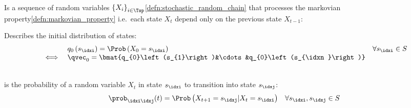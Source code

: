 \begin{defnbox}
  \begin{defn}\label{defn:markov_chain}\leavevmode\\
  \begin{minipage}[t]{0.6\textwidth}
    Is a sequence of random variables $\left\{X_{i}\right\}_{i\in\Tsp}$\cref{defn:stochastic_random_chain}
    that processes the markovian property\cref{defn:markovian_property} i.e.\ each state $X_{t}$
    depend only on the previous state $X_{t-1}$:
  \end{minipage}
  \begin{minipage}[t]{0.3\textwidth}
    \begin{figure}[H]
      \vspace{-0.7cm}
      \centering{
        \def\svgwidth{100pt}
        \resizebox{\linewidth}{!}{}
      }
    \end{figure}
  \end{minipage}
  \end{defn}
\end{defnbox}
\begin{defnbox}\nospacing
  \begin{defn}\label{defn:initial_distribution}
    Describes the initial distribution of states:
    \begin{align}
      &&&q_{0}\left(s_{\idxi}\right)=\Prob \left(X_{0}=s_{\idxi}\right)&&\forall s_{\idxi}\in S\nonumber \\[-1\jot]
      &\iff&&\qvec_{0}=\bmat{q_{0}\left(s_{1}\right)&\cdots&q_{0}\left(s_{\idxn}\right)}
    \end{align}
  \end{defn}
\end{defnbox}
\begin{defnbox}\nospacing
  \begin{defn}\label{defn:markov_transition_probability}\leavevmode\\
    is the probability of a random variable $X_{t}$ in state $s_{\idxi}$ to transition into state $s_{\idxj}$:
    \begin{align}
      \prob_{\idxi\idxj}(t)=\Prob \left(X_{t+1}=s_{\idxj}|X_{t}=s_{\idxi}\right)&&\forall s_{\idxi},s_{\idxj}\in S\label{eq:markov_transition_probability}
    \end{align}
  \end{defn}
\end{defnbox}
